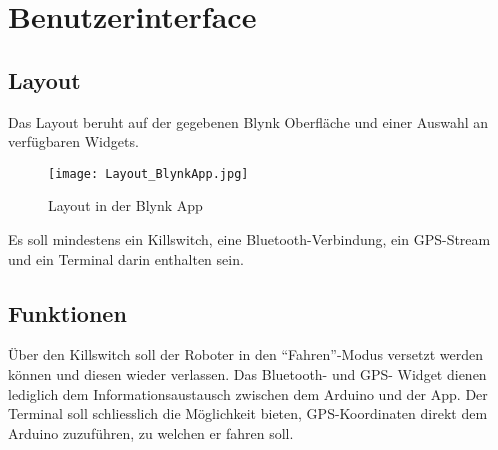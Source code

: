 \section{Benutzerinterface}

\subsection{Layout}
Das Layout beruht auf der gegebenen Blynk Oberfläche und einer Auswahl an verfügbaren Widgets. 

\begin{figure}[H]
    \begin{center}
    \texttt{[image: Layout\_BlynkApp.jpg]}
    \end{center}
    \caption{Layout in der Blynk App}
\end{figure}

Es soll mindestens ein Killswitch, eine Bluetooth-Verbindung, ein GPS-Stream und ein Terminal darin enthalten sein.

\subsection{Funktionen}
Über den Killswitch soll der Roboter in den “Fahren”-Modus versetzt werden können und diesen wieder verlassen. Das Bluetooth- und GPS- Widget dienen lediglich dem Informationsaustausch zwischen dem Arduino und der App. Der Terminal soll schliesslich die Möglichkeit bieten, GPS-Koordinaten direkt dem Arduino zuzuführen, zu welchen er fahren soll.